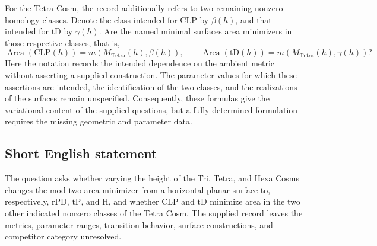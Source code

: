 \documentclass[11pt]{article}
\begin{document}
For the Tetra Cosm, the record additionally refers to two remaining nonzero homology classes. Denote the class intended for \(\mathrm{CLP}\) by \(\beta(h)\), and that intended for \(\mathrm{tD}\) by \(\gamma(h)\). Are the named minimal surfaces area minimizers in those respective classes, that is,
\[
 \operatorname{Area}(\mathrm{CLP}(h))=m(M_{\mathrm{Tetra}}(h),\beta(h)),
 \qquad
 \operatorname{Area}(\mathrm{tD}(h))=m(M_{\mathrm{Tetra}}(h),\gamma(h))?
\]
Here the notation records the intended dependence on the ambient metric without asserting a supplied construction. The parameter values for which these assertions are intended, the identification of the two classes, and the realizations of the surfaces remain unspecified. Consequently, these formulas give the variational content of the supplied questions, but a fully determined formulation requires the missing geometric and parameter data.
\subsection{Short English statement}
The question asks whether varying the height of the Tri, Tetra, and Hexa Cosms changes the mod-two area minimizer from a horizontal planar surface to, respectively, \(\mathrm{rPD}\), \(\mathrm{tP}\), and \(\mathrm{H}\), and whether \(\mathrm{CLP}\) and \(\mathrm{tD}\) minimize area in the two other indicated nonzero classes of the Tetra Cosm. The supplied record leaves the metrics, parameter ranges, transition behavior, surface constructions, and competitor category unresolved.
\end{document}
